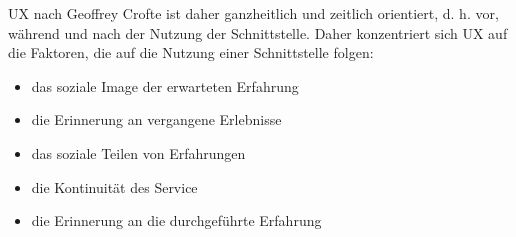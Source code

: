 UX nach Geoffrey Crofte \cite{uxCrofte} ist daher ganzheitlich und zeitlich orientiert, d. h. vor, während und nach der Nutzung der Schnittstelle. Daher konzentriert sich UX auf die Faktoren, die auf die Nutzung einer Schnittstelle folgen:

\begin{itemize}
  \item das soziale Image der erwarteten Erfahrung
  \item die Erinnerung an vergangene Erlebnisse
  \item das soziale Teilen von Erfahrungen
  \item die Kontinuität des Service
  \item die Erinnerung an die durchgeführte Erfahrung
\end{itemize}